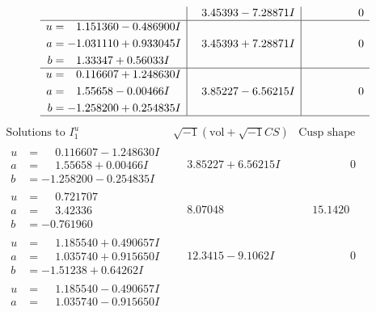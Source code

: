 \documentclass[1p]{elsarticle_modified}
\theoremstyle{definition}
\newcommand{\I}{\sqrt{-1}}
\begin{document}
$$\begin{array}{c|c|c}
 & \phantom{-}3.45393 - 7.28871 I & \phantom{-0.000000 } 0 \\ \hline\begin{aligned}
u &= \phantom{-}1.151360 - 0.486900 I \\
a &= -1.031110 + 0.933045 I \\
b &= \phantom{-}1.33347 + 0.56033 I\end{aligned}
 & \phantom{-}3.45393 + 7.28871 I & \phantom{-0.000000 } 0 \\ \hline\begin{aligned}
u &= \phantom{-}0.116607 + 1.248630 I \\
a &= \phantom{-}1.55658 - 0.00466 I \\
b &= -1.258200 + 0.254835 I\end{aligned}
 & \phantom{-}3.85227 - 6.56215 I & \phantom{-0.000000 } 0\\
 \hline 
 \end{array}$$\newpage$$\begin{array}{c|c|c}  
\text{Solutions to }I^u_{1}& \I (\text{vol} + \sqrt{-1}CS) & \text{Cusp shape}\\
 \hline 
\begin{aligned}
u &= \phantom{-}0.116607 - 1.248630 I \\
a &= \phantom{-}1.55658 + 0.00466 I \\
b &= -1.258200 - 0.254835 I\end{aligned}
 & \phantom{-}3.85227 + 6.56215 I & \phantom{-0.000000 } 0 \\ \hline\begin{aligned}
u &= \phantom{-}0.721707\phantom{ +0.000000I} \\
a &= \phantom{-}3.42336\phantom{ +0.000000I} \\
b &= -0.761960\phantom{ +0.000000I}\end{aligned}
 & \phantom{-}8.07048\phantom{ +0.000000I} & \phantom{-}15.1420\phantom{ +0.000000I} \\ \hline\begin{aligned}
u &= \phantom{-}1.185540 + 0.490657 I \\
a &= \phantom{-}1.035740 + 0.915650 I \\
b &= -1.51238 + 0.64262 I\end{aligned}
 & \phantom{-}12.3415 - 9.1062 I & \phantom{-0.000000 } 0 \\ \hline\begin{aligned}
u &= \phantom{-}1.185540 - 0.490657 I \\
a &= \phantom{-}1.035740 - 0.915650 I \\

\end{aligned}
\end{array}$$
\end{document}
